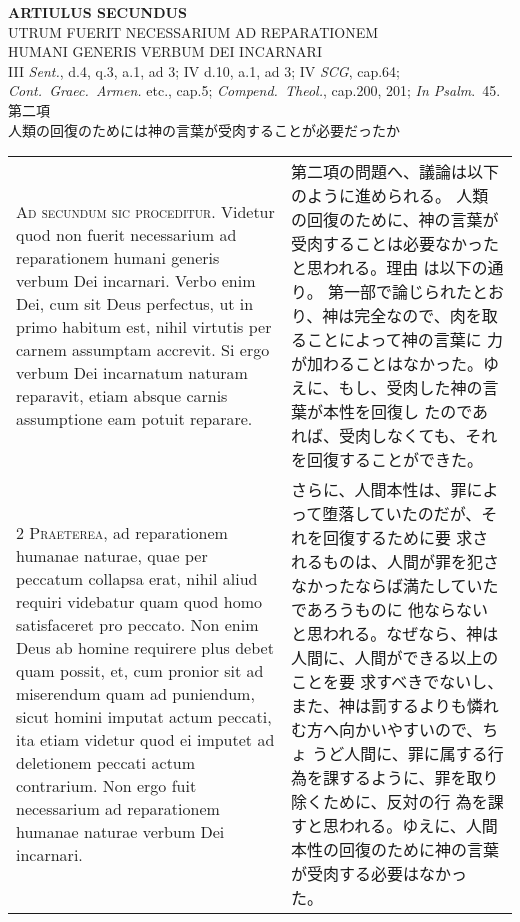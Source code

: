 \documentclass[10pt]{jsarticle} %
\begin{document}
\newpage

\begin{center}
 {\Large {\bf ARTIULUS SECUNDUS}}\\
 {\large UTRUM FUERIT NECESSARIUM AD REPARATIONEM\\HUMANI GENERIS VERBUM
 DEI INCARNARI}\\
 {\footnotesize III {\itshape Sent.}, d.4, q.3, a.1, ad 3; IV d.10, a.1,
 ad 3; IV {\itshape SCG}, cap.64; {\itshape Cont.~Graec.~Armen.} etc.,
 cap.5; {\itshape Compend.~Theol.}, cap.200, 201; {\itshape In Psalm}.~45.}\\
 {\Large 第二項\\人類の回復のためには神の言葉が受肉することが必要だったか}
\end{center}

\begin{longtable}{p{21em}p{21em}}

{\Huge A}{\scshape d secundum sic proceditur}. Videtur quod non fuerit
 necessarium ad reparationem humani generis verbum Dei incarnari. Verbo
 enim Dei, cum sit Deus perfectus, ut in primo habitum est, nihil
 virtutis per carnem assumptam accrevit. Si ergo verbum Dei incarnatum
 naturam reparavit, etiam absque carnis assumptione eam potuit reparare.


&

第二項の問題へ、議論は以下のように進められる。
人類の回復のために、神の言葉が受肉することは必要なかったと思われる。理由
 は以下の通り。
第一部で論じられたとおり、神は完全なので、肉を取ることによって神の言葉に
 力が加わることはなかった。ゆえに、もし、受肉した神の言葉が本性を回復し
 たのであれば、受肉しなくても、それを回復することができた。



\\

{\scshape 2 Praeterea}, ad reparationem humanae naturae, quae per
 peccatum collapsa erat, nihil aliud requiri videbatur quam quod homo
 satisfaceret pro peccato. Non enim Deus ab homine requirere plus debet
 quam possit, et, cum pronior sit ad miserendum quam ad puniendum, sicut
 homini imputat actum peccati, ita etiam videtur quod ei imputet ad
 deletionem peccati actum contrarium. Non ergo fuit necessarium ad
 reparationem humanae naturae verbum Dei incarnari.

&

さらに、人間本性は、罪によって堕落していたのだが、それを回復するために要
 求されるものは、人間が罪を犯さなかったならば満たしていたであろうものに
 他ならないと思われる。なぜなら、神は人間に、人間ができる以上のことを要
 求すべきでないし、また、神は罰するよりも憐れむ方へ向かいやすいので、ちょ
 うど人間に、罪に属する行為を課するように、罪を取り除くために、反対の行
 為を課すと思われる。ゆえに、人間本性の回復のために神の言葉が受肉する必要はなかっ
 た。



\end{longtable}
\end{document}
